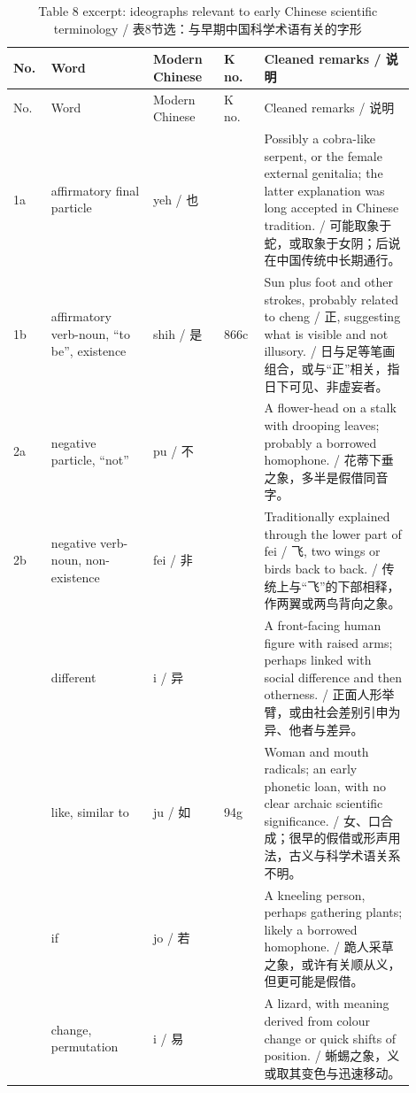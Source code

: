 \documentclass[UTF8,zihao=-4]{ctexart}
\begin{document}
\begin{longtable}{>{\raggedright\arraybackslash}p{0.08\linewidth}
                  >{\raggedright\arraybackslash}p{0.23\linewidth}
                  >{\raggedright\arraybackslash}p{0.16\linewidth}
                  >{\raggedright\arraybackslash}p{0.09\linewidth}
                  >{\raggedright\arraybackslash}p{0.34\linewidth}}
\caption{Table 8 excerpt: ideographs relevant to early Chinese scientific terminology / 表8节选：与早期中国科学术语有关的字形}\\
\toprule
No. & Word & Modern Chinese & K no. & Cleaned remarks / 说明 \\
\midrule
\endfirsthead
\toprule
No. & Word & Modern Chinese & K no. & Cleaned remarks / 说明 \\
\midrule
\endhead
1a & affirmatory final particle & yeh / 也 & 4 & Possibly a cobra-like serpent, or the female external genitalia; the latter explanation was long accepted in Chinese tradition. / 可能取象于蛇，或取象于女阴；后说在中国传统中长期通行。\\
1b & affirmatory verb-noun, ``to be'', existence & shih / 是 & 866c & Sun plus foot and other strokes, probably related to cheng / 正, suggesting what is visible and not illusory. / 日与足等笔画组合，或与“正”相关，指日下可见、非虚妄者。\\
2a & negative particle, ``not'' & pu / 不 & 999 & A flower-head on a stalk with drooping leaves; probably a borrowed homophone. / 花蒂下垂之象，多半是假借同音字。\\
2b & negative verb-noun, non-existence & fei / 非 & 579 & Traditionally explained through the lower part of fei / 飞, two wings or birds back to back. / 传统上与“飞”的下部相释，作两翼或两鸟背向之象。\\
3 & different & i / 异 & 954 & A front-facing human figure with raised arms; perhaps linked with social difference and then otherness. / 正面人形举臂，或由社会差别引申为异、他者与差异。\\
4 & like, similar to & ju / 如 & 94g & Woman and mouth radicals; an early phonetic loan, with no clear archaic scientific significance. / 女、口合成；很早的假借或形声用法，古义与科学术语关系不明。\\
5 & if & jo / 若 & 777 & A kneeling person, perhaps gathering plants; likely a borrowed homophone. / 跪人采草之象，或许有关顺从义，但更可能是假借。\\
6 & change, permutation & i / 易 & 850 & A lizard, with meaning derived from colour change or quick shifts of position. / 蜥蜴之象，义或取其变色与迅速移动。\\

\end{longtable}
\end{document}
